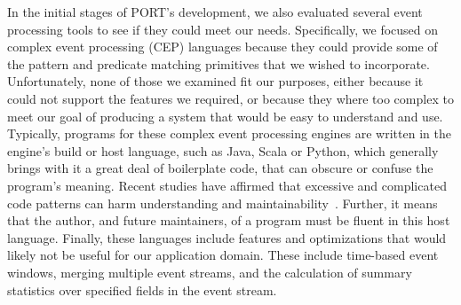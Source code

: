 In the initial stages of PORT's development, we also
evaluated several event processing tools to see if
they could meet our needs.
Specifically,
we focused on
complex event processing (CEP) languages because they
could
provide some of the pattern and predicate matching primitives
that we wished to
incorporate.
Unfortunately,
none of those we examined fit our purposes,
either because it could not support the features
we required, or because they where too complex
to meet our
goal of producing a system
that would be easy to understand and use.
Typically,
programs for these complex event processing engines are
written in the engine's build or host language,
such as Java,
Scala or
Python,
which generally brings with it a great deal of boilerplate code,
that can obscure or confuse
the program's meaning.
Recent studies
have affirmed that excessive and complicated code
patterns can harm
understanding and
maintainability~\cite{misunderstandings}.
Further,
it means that the author,
and future maintainers,
of a
program must be fluent in this host language.
Finally,
these languages include features and optimizations
that would likely not be useful for our application domain.
These include time-based event windows,
merging multiple event streams,
and the calculation of
summary statistics over specified fields in the event stream.

